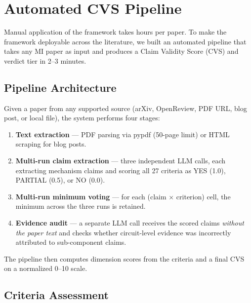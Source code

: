\documentclass[10pt]{article}
\begin{document}
\section{Automated CVS Pipeline}
\label{sec:pipeline}

Manual application of the framework takes hours per paper. To make the framework deployable across the literature, we built an automated pipeline that takes any MI paper as input and produces a Claim Validity Score (CVS) and verdict tier in 2--3 minutes.


\subsection{Pipeline Architecture}

Given a paper from any supported source (arXiv, OpenReview, PDF URL, blog post, or local file), the system performs four stages:

\begin{enumerate}[nosep]
    \item \textbf{Text extraction} --- PDF parsing via pypdf (50-page limit) or HTML scraping for blog posts.
    \item \textbf{Multi-run claim extraction} --- three independent LLM calls, each extracting mechanism claims and scoring all 27 criteria as YES (1.0), PARTIAL (0.5), or NO (0.0).
    \item \textbf{Multi-run minimum voting} --- for each (claim $\times$ criterion) cell, the minimum across the three runs is retained.
    \item \textbf{Evidence audit} --- a separate LLM call receives the scored claims \emph{without the paper text} and checks whether circuit-level evidence was incorrectly attributed to sub-component claims.
\end{enumerate}

The pipeline then computes dimension scores from the criteria and a final CVS on a normalized 0--10 scale.

\subsection{Criteria Assessment}
\end{document}
